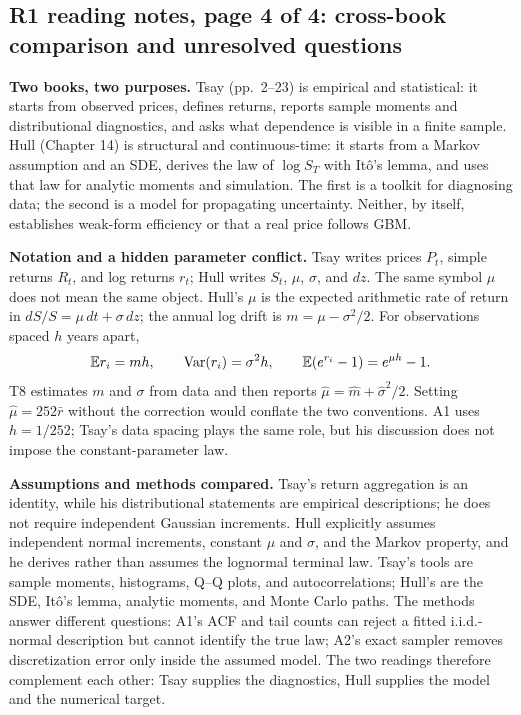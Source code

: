 \subsection*{R1 reading notes, page 4 of 4: cross-book comparison and unresolved questions}
\textbf{Two books, two purposes.} Tsay (pp.~2--23) is empirical and statistical: it starts from observed prices, defines returns, reports sample moments and distributional diagnostics, and asks what dependence is visible in a finite sample. Hull (Chapter 14) is structural and continuous-time: it starts from a Markov assumption and an SDE, derives the law of $\log S_T$ with It\^o's lemma, and uses that law for analytic moments and simulation. The first is a toolkit for diagnosing data; the second is a model for propagating uncertainty. Neither, by itself, establishes weak-form efficiency or that a real price follows GBM.

\textbf{Notation and a hidden parameter conflict.} Tsay writes prices $P_t$, simple returns $R_t$, and log returns $r_t$; Hull writes $S_t$, $\mu$, $\sigma$, and $dz$. The same symbol $\mu$ does not mean the same object. Hull's $\mu$ is the expected arithmetic rate of return in $dS/S=\mu\,dt+\sigma\,dz$; the annual log drift is $m=\mu-\sigma^2/2$. For observations spaced $h$ years apart,
\[
 \mathbb E r_i=mh,\qquad \operatorname{Var}(r_i)=\sigma^2h,\qquad
 \mathbb E(e^{r_i}-1)=e^{\mu h}-1.
\]
T8 estimates $m$ and $\sigma$ from data and then reports $\widehat\mu=\widehat m+\widehat\sigma^2/2$. Setting $\widehat\mu=252\bar r$ without the correction would conflate the two conventions. A1 uses $h=1/252$; Tsay's data spacing plays the same role, but his discussion does not impose the constant-parameter law.

\textbf{Assumptions and methods compared.} Tsay's return aggregation is an identity, while his distributional statements are empirical descriptions; he does not require independent Gaussian increments. Hull explicitly assumes independent normal increments, constant $\mu$ and $\sigma$, and the Markov property, and he derives rather than assumes the lognormal terminal law. Tsay's tools are sample moments, histograms, Q--Q plots, and autocorrelations; Hull's are the SDE, It\^o's lemma, analytic moments, and Monte Carlo paths. The methods answer different questions: A1's ACF and tail counts can reject a fitted i.i.d.-normal description but cannot identify the true law; A2's exact sampler removes discretization error only inside the assumed model. The two readings therefore complement each other: Tsay supplies the diagnostics, Hull supplies the model and the numerical target.

